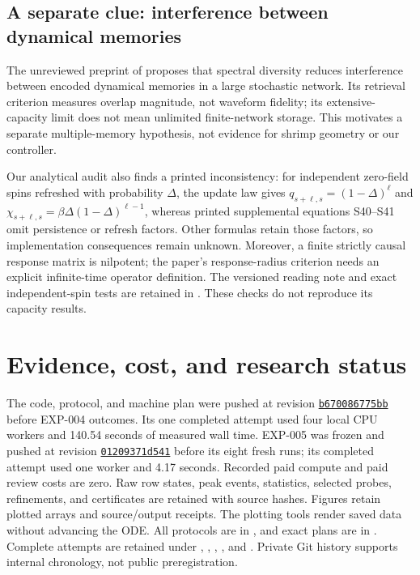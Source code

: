 \documentclass[11pt,letterpaper]{article}
\begin{document}
\subsection{A separate clue: interference between dynamical memories}
The unreviewed preprint of \citet{aguilera2026} proposes that spectral diversity reduces interference between encoded dynamical memories in a large stochastic network. Its retrieval criterion measures overlap magnitude, not waveform fidelity; its extensive-capacity limit does not mean unlimited finite-network storage. This motivates a separate multiple-memory hypothesis, not evidence for shrimp geometry or our controller.

Our analytical audit also finds a printed inconsistency: for independent zero-field spins refreshed with probability $\Delta$, the update law gives $q_{s+\ell,s}=(1-\Delta)^\ell$ and $\chi_{s+\ell,s}=\beta\Delta(1-\Delta)^{\ell-1}$, whereas printed supplemental equations S40--S41 omit persistence or refresh factors. Other formulas retain those factors, so implementation consequences remain unknown. Moreover, a finite strictly causal response matrix is nilpotent; the paper's response-radius criterion needs an explicit infinite-time operator definition. The versioned reading note and exact independent-spin tests are retained in . These checks do not reproduce its capacity results.

\section*{Evidence, cost, and research status}
The code, protocol, and machine plan were pushed at revision
\href{https://github.com/tdj28/neural-shrimp/commit/b670086775bbc07e115de730b8fcb30ca41cce6b}{\texttt{b670086775bb}}
before EXP-004 outcomes. Its one completed attempt used four local CPU workers and 140.54 seconds of measured wall time. EXP-005 was frozen and pushed at revision \href{https://github.com/tdj28/neural-shrimp/commit/01209371d541aaa9d072a1addb3960aa3a74efd3}{\texttt{01209371d541}} before its eight fresh runs; its completed attempt used one worker and 4.17 seconds. Recorded paid compute and paid review costs are zero. Raw row states, peak events, statistics, selected probes, refinements, and certificates are retained with source hashes. Figures retain plotted arrays and source/output receipts. The plotting tools render saved data without advancing the ODE. All protocols are in , and exact plans are in . Complete attempts are retained under , , , , and . Private Git history supports internal chronology, not public preregistration.
\end{document}
